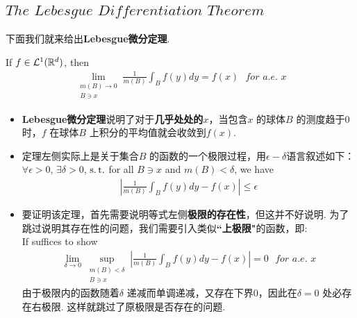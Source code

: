 \subsection{$The \,\, Lebesgue \,\, Differentiation \,\, Theorem$}
	下面我们就来给出\textbf{Lebesgue微分定理}.
	\begin{thm}\label{thm 4.2.2}
		If $f \in \mathcal{L}^{1}(\mathbb{R}^d)$, then
		\begin{align}
			\lim_{\substack{m(B) \to 0 \\ B \ni x}}{\frac{1}{m(B)} \int_{B}{f(y) dy}} = f(x) \,\,\,\, for \,\, a.e. \,\, x
		\end{align}
		
		\vspace{2em}
		\begin{rmk}
			\begin{itemize}
				\item \textbf{Lebesgue微分定理}说明了对于\textbf{几乎处处的$x$}，当包含$x$ 的球体$B$ 的测度趋于0时，$f$ 在球体$B$ 上积分的平均值就会收敛到$f(x)$.
				
				\vspace{2em}
				
				\item 定理左侧实际上是关于集合$B$ 的函数的一个极限过程，用$\epsilon-\delta$语言叙述如下：\\
				$\forall \epsilon > 0$, $\exists \delta> 0$, $\operatorname{s.t.}$ for all $B \ni x$ and $m(B) < \delta$, we have
				\begin{align}
					\left| \frac{1}{m(B)} \int_{B}{f(y) dy} - f(x) \right| \leq \epsilon
				\end{align}
			
				\vspace{2em}
				
				\item 要证明该定理，首先需要说明等式左侧\textbf{极限的存在性}，但这并不好说明. 为了跳过说明其存在性的问题，我们需要引入类似\textbf{``上极限"}的函数，即: \\
				If suffices to show
				\begin{align}
					\lim_{\delta \to 0}{\sup_{\substack{m(B) < \delta \\ B \ni x}}{\left| \frac{1}{m(B)} \int_{B}{f(y) dy} - f(x) \right|}} = 0 \,\,\,\, for \,\, a.e. \,\, x
				\end{align}
				由于极限内的函数随着$\delta$ 递减而单调递减，又存在下界$0$，因此在$\delta = 0$ 处必存在右极限. 这样就跳过了原极限是否存在的问题.
				
				\vspace{2em}
				

\end{itemize}
\end{rmk}
\end{thm}
